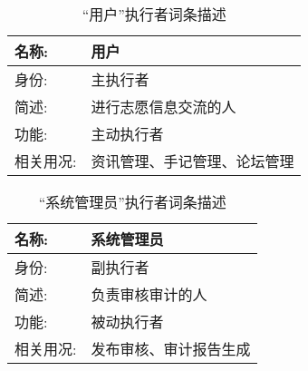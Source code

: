 \begin{table}[H]  
\caption{“用户”执行者词条描述}  
\begin{center}  
    \begin{tabular}{l p{11cm}} 
        \hline
        \quad 名称:  &  用户 \\
        \hline
        \quad 身份:  & 主执行者 \\
        \hline
        \quad 简述:  & 进行志愿信息交流的人 \\
        \hline
        \quad 功能:  & 主动执行者 \\
        \hline
        \quad 相关用况:  & 资讯管理、手记管理、论坛管理 \\
        \hline
    \end{tabular}
\end{center}
\end{table}

\begin{table}[H]  
\caption{“系统管理员”执行者词条描述}  
\begin{center}  
    \begin{tabular}{l p{11cm}} 
        \hline
        \quad 名称:  &  系统管理员 \\
        \hline
        \quad 身份:  & 副执行者 \\
        \hline
        \quad 简述:  & 负责审核审计的人 \\
        \hline
        \quad 功能:  & 被动执行者 \\
        \hline
        \quad 相关用况:  & 发布审核、审计报告生成\\
        \hline
    \end{tabular}
\end{center}
\end{table}
